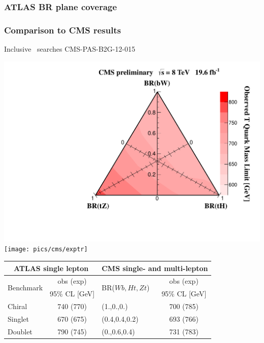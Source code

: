 \begin{frame}\frametitle{ATLAS BR plane coverage}%
\centering\footnotesize


\end{frame}


\begin{frame}\frametitle{Comparison to CMS results}
\centering\footnotesize

Inclusive \TTbar\ searches {\cccolor CMS-PAS-B2G-12-015~\cite{CMS-PAS-B2G-12-015}}
\myskip

\includegraphics[width=.34\textwidth]{pics/cms/triangle}
\texttt{[image: pics/cms/exptr]}

\begin{tabular}{lclc}\toprule
\multicolumn{2}{c}{ATLAS single lepton} & \multicolumn{2}{c}{CMS single- and multi-lepton}\\\midrule
\multirow{2}{*}{Benchmark} & obs (exp) & \multirow{2}{*}{BR($Wb,Ht,Zt$)}  & obs (exp) \\
          & 95\% CL [GeV] & & 95\% CL [GeV] \\
Chiral & 740 (770) & (1.,0.,0.) & 700 (785)\\
Singlet & 670 (675) & (0.4,0.4,0.2) & 693 (766)\\
Doublet & 790 (745) & (0.,0.6,0.4) & 731 (783) \\
\bottomrule\end{tabular}


\end{frame}




